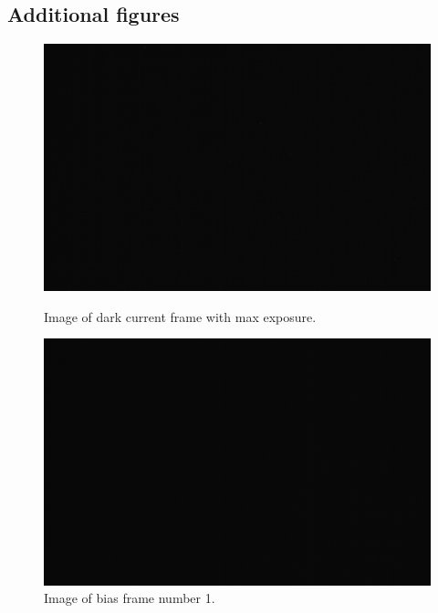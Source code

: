 \documentclass{emulateapj}
\begin{document}
\begin{appendices}
\section{Additional figures}
\label{asec: Additional figures}
\begin{figure}[h!]
	\begin{minipage}{.5\textwidth}
	\centering
	\includegraphics[width=0.8\linewidth]{./images/ex3_4_5/dark_max.pdf}
	\caption[Dark current correction frame with max exposure]{Image of dark current frame with max exposure.}
	\label{fig: Image dark max frame}
	\end{minipage}%
	\begin{minipage}{.5\textwidth}
	\centering
	\includegraphics[width=0.8\linewidth]{./images/ex3_4_5/bias1.pdf}
	\caption[Bias correction frame 1]{Image of bias frame number 1.}
	\label{fig: Image bias frame}
	\end{minipage}
\end{figure}


\end{appendices}
\end{document}
